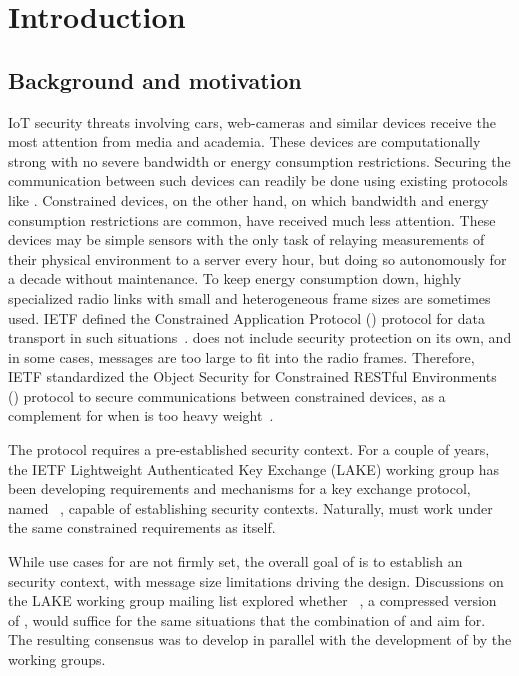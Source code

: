\documentclass[runningheads, envcountsame, a4paper, draft, x11names]{llncs}
\newcommand{\fillhack}{\vspace{-0.5em}}
\begin{document}
\section{Introduction}
\label{sec:introduction}
\fillhack

\subsection{Background and motivation}
\label{sec:motivation}
\fillhack
IoT security threats involving cars, web-cameras and similar devices
receive the most attention from media and academia.
%
These devices are computationally strong with no severe bandwidth or energy consumption restrictions.
%
Securing the communication between such devices can readily be done using existing protocols like \mDandTls.
%
Constrained devices, on the other hand, on which bandwidth and
energy consumption restrictions are common, have received much less attention.
%
These devices may be simple sensors with the only task of relaying
measurements of their physical environment to a server every hour, but doing so
autonomously for a decade without maintenance.
%
To keep energy consumption down, highly specialized radio links with small
and heterogeneous frame sizes are sometimes used.
%
IETF defined the Constrained Application Protocol (\mCoap{}) protocol for data
transport in such situations~\cite{rfc7252}.
%
\mCoap{} does not include security protection on its own, and in some cases, \mDandTls{} messages are too large to fit into the radio frames.
%
Therefore, IETF standardized the Object Security for
Constrained RESTful Environments (\mOscore{}) protocol to secure
communications between constrained devices, as a complement for when
\mDandTls{} is too heavy weight~\cite{rfc8613}.
%

The \mOscore{} protocol requires a pre-established security context.
%
For a couple of years, the IETF Lightweight Authenticated Key Exchange (LAKE)
working group has been developing requirements and mechanisms for a key
exchange protocol, named \mEdhoc~\cite{selander-lake-edhoc-01}, capable of
establishing \mOscore{} security contexts.
%
Naturally, \mEdhoc{} must work under the same constrained requirements as
\mOscore{} itself.
%

While use cases for \mEdhoc{} are not firmly set, the overall goal of \mEdhoc{} is to establish an \mOscore{} security context, with message size limitations driving the design.
%
Discussions on the LAKE working group mailing list explored whether \mCtls~\cite{ietf-tls-ctls-00}, a compressed version of \mTls, would suffice for the same situations that the combination of \mOscore{} and \mEdhoc{} aim for.
%
The resulting consensus was to develop \mEdhoc{} in parallel with the development of \mCtls by the \mTls working groups.
%
\end{document}
